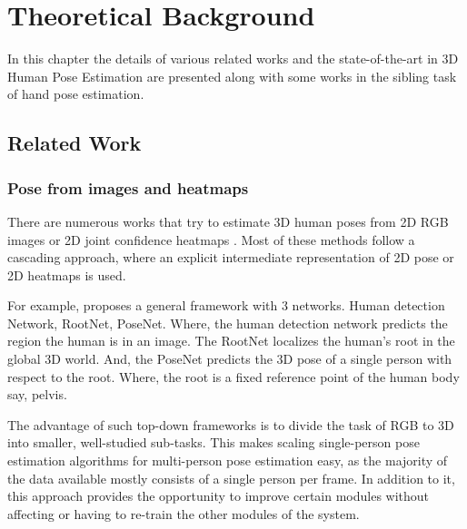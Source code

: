 \chapter{Theoretical Background}
\label{chap:background}


In this chapter the details of various related works and the state-of-the-art in 3D Human Pose Estimation are presented along with some works in the sibling task of hand pose estimation.





\section{Related Work}
\label{sec:relatedwork}

\subsection{Pose from images and heatmaps}
There are numerous works that try to estimate 3D human poses from 2D \ac{RGB} images or 2D joint confidence heatmaps \cite{CameraDistanceAware, poselifter, DistillNRSfM, occlusionVideo}. Most of these methods follow a cascading approach, where an explicit intermediate representation of 2D pose or 2D heatmaps is used. 

For example, \cite{CameraDistanceAware} proposes a general framework with 3 networks. Human detection Network, RootNet, PoseNet. Where, the human detection network predicts the region the human is in an image. The RootNet localizes the human's root in the global 3D world. And, the PoseNet predicts the 3D pose of a single person with respect to the root. Where, the root is a fixed reference point of the human body say, pelvis.

The advantage of such top-down frameworks is to divide the task of RGB to 3D into smaller, well-studied sub-tasks. This makes scaling single-person pose estimation algorithms for multi-person pose estimation easy, as the majority of the data available mostly consists of a single person per frame. In addition to it, this approach provides the opportunity to improve certain modules without affecting or having to re-train the other modules of the system.

